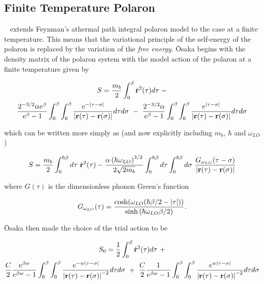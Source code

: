 \subsection{Finite Temperature Polaron}
\label{subsec:2-2-3}

~\cite{osaka_polaron_1959} extends Feynman's athermal path integral polaron model to the case at a finite temperature. This means that the variational principle of the self-energy of the polaron is replaced by the variation of the \emph{free energy}. \=Osaka begins with the density matrix of the polaron system with the model action of the polaron at a finite temperature given by

\begin{equation}
    \begin{gathered}
    S = \frac{m_b}{2} \int_0^\beta \dot{\vb{r}}^2(\tau) d\tau\ -\\ \frac{2^{-3/2}\alpha e^\beta}{e^\beta - 1} \int_0^\beta \int_0^\beta \frac{e^{-|\tau-\sigma|}}{\left| \vb{r}(\tau) - \vb{r}(\sigma) \right|} d\tau d\sigma \ -\  \frac{2^{-3/2}\alpha}{e^\beta - 1} \int_0^\beta \int_0^\beta \frac{e^{|\tau-\sigma|}}{\left| \vb{r}(\tau) - \vb{r}(\sigma) \right|} d\tau d\sigma
    \end{gathered}
\end{equation}

which can be written more simply as (and now explicitly including $m_b$, $\hbar$ and $\omega_{LO}$)

\begin{equation}\label{eqn:thermal_action}
    S = \frac{m_b}{2} \int_0^{\hbar\beta} d\tau\ \dot{\vb{r}}^2(\tau) - \frac{\alpha \left(\hbar \omega_{LO}\right)^{3/2}}{2\sqrt{2 m_b}} \int_0^{\hbar\beta} d\tau \int_0^{\hbar\beta} d\sigma\ \frac{G_{\omega_{LO}}(\tau - \sigma)}{\abs{\vb{r}(\tau) - \vb{r}(\sigma)}}
\end{equation}

where $G(\tau)$ is the dimensionless phonon Green's function

\begin{equation}
    G_{\omega_{LO}}(\tau) = \frac{\cosh(\omega_{LO} (\hbar\beta/2 - \abs{\tau}))}{\sinh\left(\hbar\omega_{LO}\beta/2\right)}.
\end{equation}

\=Osaka then made the choice of the trial action to be

\begin{equation}
    \begin{gathered}
    S_0 = \frac{1}{2} \int_0^\beta \dot{\vb{r}}^2(\tau) d\tau\ +\\ \frac{C}{2}\frac{e^{\beta w}}{e^{\beta w} - 1} \int_0^\beta \int_0^\beta \frac{e^{-w|\tau-\sigma|}}{\left| \vb{r}(\tau) - \vb{r}(\sigma) \right|^{-2}} d\tau d\sigma \ +\ \frac{C}{2}\frac{1}{e^{\beta w} - 1} \int_0^\beta \int_0^\beta \frac{e^{w|\tau-\sigma|}}{\left| \vb{r}(\tau) - \vb{r}(\sigma) \right|^{-2}} d\tau d\sigma
    \end{gathered}
\end{equation}

